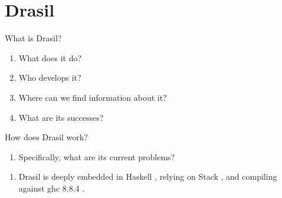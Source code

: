 \chapter{Drasil}
\label{chap:drasil}

\begin{writingdirectives}
      
      \item What is Drasil?
            \begin{enumerate}
                  \item What does it do?
                  \item Who develops it?
                  \item Where can we find information about it?
                  \item What are its successes?
            \end{enumerate}

      \item How does Drasil work?
            \begin{enumerate}
                  \item Specifically, what are its current problems?
            \end{enumerate}

\end{writingdirectives}

\begin{enumerate}

      \item Drasil is deeply embedded in Haskell \cite{Haskell2010}, relying on
            Stack \cite{HaskellStack}, and compiling against \acs{ghc} 8.8.4
            \cite{GHC884}.

\end{enumerate}

\drasilLogoImg{}

